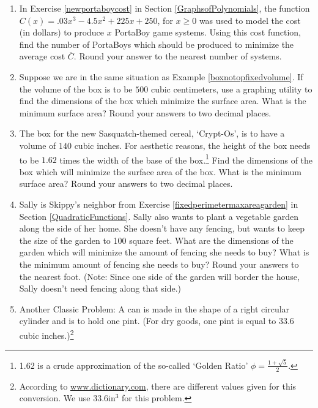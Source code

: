 \begin{enumerate}
\setcounter{enumi}{\value{HW}}


\item  In Exercise \ref{newportaboycost} in Section \ref{GraphsofPolynomials},  the function $C(x) = .03x^{3} - 4.5x^{2} + 225x + 250$, for $x \geq 0$ was used to model the cost (in dollars) to produce $x$ PortaBoy game systems. Using this cost function, find the number of PortaBoys which should be produced to minimize the average cost $\overline{C}$.  Round your answer to the nearest number of systems. 

\item  Suppose we are in the same situation as Example \ref{boxnotopfixedvolume}.  If the volume of the box is to be $500$ cubic centimeters, use a graphing utility to find the dimensions of the box which minimize the surface area.  What is the minimum surface area?  Round your answers to two decimal places.

\item  The box for the new Sasquatch-themed cereal, `Crypt-Os', is to have a volume of $140$ cubic inches.  For aesthetic reasons, the height of the box needs to be $1.62$ times the width of the base of the box.\footnote{1.62 is a crude approximation of the so-called `Golden Ratio' $\phi = \frac{1 + \sqrt{5}}{2}$.}  Find the dimensions of the box which will minimize the surface area of the box.  What is the minimum surface area?  Round your answers to two decimal places.   

\item \label{fixedareaminperimetergarden} Sally is Skippy's neighbor from Exercise \ref{fixedperimetermaxareagarden} in Section \ref{QuadraticFunctions}.   Sally also wants to plant a vegetable garden along the side of her home.  She doesn't have any fencing, but wants to keep the size of the garden to 100 square feet.  What are the dimensions of the garden which will minimize the amount of fencing she needs to buy?  What is the minimum amount of fencing she needs to buy? Round your answers to the nearest foot. (Note:  Since one side of the garden will border the house, Sally doesn't need fencing along that side.)



\item Another Classic Problem: A can is made in the shape of a right circular cylinder and is to hold one pint. (For dry goods, one pint is equal to $33.6$ cubic inches.)\footnote{According to \href{http://dictionary.reference.com/browse/pint}{\underline{www.dictionary.com}}, there are different values given for this conversion. We use $33.6 \text{in}^{3}$ for this problem.}  


\end{enumerate}
